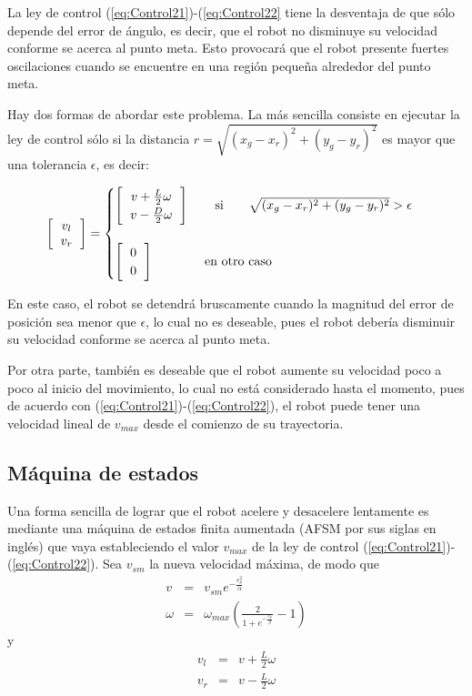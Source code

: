\documentclass[letterpaper,12pt]{article}
\begin{document}
  
La ley de control (\ref{eq:Control21})-(\ref{eq:Control22} tiene la desventaja de que sólo depende del error de ángulo, es decir, que el robot no disminuye su velocidad conforme se acerca al punto meta. Esto provocará que el robot presente fuertes oscilaciones cuando se encuentre en una región pequeña alrededor del punto meta.

Hay dos formas de abordar este problema. La más sencilla consiste en ejecutar la ley de control sólo si la distancia $r=\sqrt{(x_g - x_r)^2 + (y_g - y_r)^2}$ es mayor que una tolerancia $\epsilon$, es decir:

\[
  \left[\begin{tabular}{c}$v_l$ \\ $v_r$ \end{tabular}\right] =
  \begin{cases}
    \left[
    \begin{tabular}{c}
      $v + \frac{L}{2}\omega$ \\
      $v - \frac{D}{2}\omega$
    \end{tabular}
  \right] \qquad \textrm{si} \qquad \sqrt{(x_g - x_r)^2 + (y_g - y_r)^2} > \epsilon \\
  \\
  \left[
    \begin{tabular}{c}$0$\\$0$\end{tabular}
  \right]  \qquad\qquad \textrm{en otro caso}
  \end{cases}
\]

En este caso, el robot se detendrá bruscamente cuando la magnitud del error de posición sea menor que $\epsilon$, lo cual no es deseable, pues el robot debería disminuir su velocidad conforme se acerca al punto meta.

Por otra parte, también es deseable que el robot aumente su velocidad poco a poco al inicio del movimiento, lo cual no está considerado hasta el momento, pues de acuerdo con (\ref{eq:Control21})-(\ref{eq:Control22}), el robot puede tener una velocidad lineal de $v_{max}$ desde el comienzo de su trayectoria.

\subsection{Máquina de estados}
Una forma sencilla de lograr que el robot acelere y desacelere lentamente es mediante una máquina de estados finita aumentada (AFSM por sus siglas en inglés) que vaya estableciendo el valor $v_{max}$ de la ley de control (\ref{eq:Control21})-(\ref{eq:Control22}). Sea $v_{sm}$ la nueva velocidad máxima, de modo que
\begin{eqnarray}
  v      &=& v_{sm}e^{-\frac{e_{\theta}^{2}}{\alpha}}\\
  \omega &=& \omega_{max}\left(\frac{2}{1+e^{-\frac{e_{\theta}}{\beta}}}-1\right)
\end{eqnarray}
y
\begin{eqnarray*}
  v_l &=& v + \frac{L}{2}\omega\\
  v_r &=& v - \frac{L}{2}\omega
\end{eqnarray*}
\end{document}
